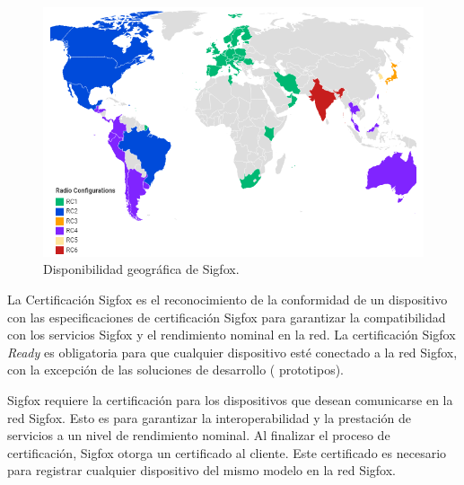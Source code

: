 \begin{figure}[h]
	\centering
	\includegraphics[scale=.65]{./Figures/coverageSigfox.PNG}
	\caption{Disponibilidad geográfica de Sigfox\protect\footnotemark.}
	\label{fig:coverageSigfox}
\end{figure}
La Certificación Sigfox es el reconocimiento de la conformidad de un dispositivo con las especificaciones de certificación Sigfox para garantizar la compatibilidad con los servicios Sigfox y el rendimiento nominal en la red. La certificación Sigfox \textit{Ready} es obligatoria para que cualquier dispositivo esté conectado a la red Sigfox, con la excepción de las soluciones de desarrollo ( prototipos).

Sigfox requiere la certificación para los dispositivos que desean comunicarse en la red Sigfox. Esto es para garantizar la interoperabilidad y la prestación de servicios a un nivel de rendimiento nominal. Al finalizar el proceso de certificación, Sigfox otorga un certificado al cliente. Este certificado es necesario para registrar cualquier dispositivo del mismo modelo en la red Sigfox.

